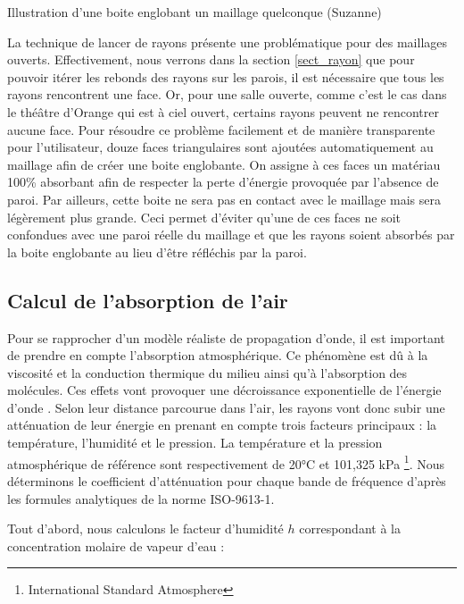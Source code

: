\begin{figureth}
\begin{subfigureth}{0.35\textwidth}
		\label{boiteenglobante2}
	\end{subfigureth}
	\caption{Illustration d'une boite englobant un maillage quelconque (Suzanne)}
\end{figureth}

La technique de lancer de rayons présente une problématique pour des maillages ouverts. Effectivement, nous verrons dans la section \ref{sect_rayon} que pour pouvoir itérer les rebonds des rayons sur les parois, il est nécessaire que tous les rayons rencontrent une face. Or, pour une salle ouverte, comme c'est le cas dans le théâtre d'Orange qui est à ciel ouvert, certains rayons peuvent ne rencontrer aucune face. Pour résoudre ce problème facilement et de manière transparente pour l'utilisateur, douze faces triangulaires sont ajoutées automatiquement au maillage afin de créer une boite englobante. On assigne à ces faces un matériau 100\% absorbant afin de respecter la perte d'énergie provoquée par l'absence de paroi. Par ailleurs, cette boite ne sera pas en contact avec le maillage mais sera légèrement plus grande. Ceci permet d'éviter qu'une de ces faces ne soit confondues avec une paroi réelle du maillage et que les rayons soient absorbés par la boite englobante au lieu d'être réfléchis par la paroi.


\subsection{Calcul de l'absorption de l'air} \label{sect_absAIr}
Pour se rapprocher d'un modèle réaliste de propagation d'onde, il est important de prendre en compte l'absorption atmosphérique. Ce phénomène est dû à la viscosité et la conduction thermique du milieu ainsi qu'à l'absorption des molécules. Ces effets vont provoquer une décroissance exponentielle de l'énergie d'onde \cite[p. 68-70]{jouhaneau}. Selon leur distance parcourue dans l'air, les rayons vont donc subir une atténuation de leur énergie en prenant en compte trois facteurs principaux : la température, l'humidité et le pression. La température et la pression atmosphérique de référence sont respectivement de 20°C et 101,325 kPa \footnote{International Standard Atmosphere}. Nous déterminons le coefficient d'atténuation pour chaque bande de fréquence d'après les formules analytiques de la norme ISO-9613-1. 

Tout d'abord, nous calculons le facteur d'humidité $h$ correspondant à la concentration molaire de vapeur d'eau \cite[Annexe B, B.1]{iso} :

